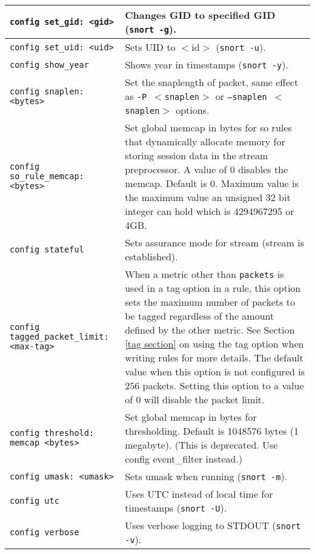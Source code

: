 \documentclass[english]{report}
\begin{document}
\begin{center}
\begin{longtable}[t]{| p{2.5in} | p{3.5in} |}
\hline
\texttt{config set\_gid: <gid>} & Changes GID to specified GID (\texttt{snort
-g}). \\

\hline
\texttt{config set\_uid: <uid>} & Sets UID to $<$id$>$ (\texttt{snort -u}). \\

\hline
\texttt{config show\_year} & Shows year in timestamps (\texttt{snort -y}). \\

\hline
\texttt{config snaplen: <bytes>} & Set the snaplength of packet, same effect as
\texttt{-P $<$snaplen$>$} or \texttt{--snaplen $<$snaplen$>$} options.\\

\hline
\texttt{config so\_rule\_memcap: <bytes>} & Set global memcap in bytes for
so rules that dynamically allocate memory for storing session data in the
stream preprocessor.  A value of 0 disables the memcap.  Default is 0.
Maximum value is the maximum value an unsigned 32 bit integer can hold
which is 4294967295 or 4GB.\\

\hline
\texttt{config stateful} & Sets assurance mode for stream (stream is
established). \\

\hline
\texttt{config tagged\_packet\_limit: <max-tag>} & When a metric other than
\texttt{packets} is used in a tag option in a rule, this option sets the
maximum number of packets to be tagged regardless of the amount defined by the
other metric.  See Section \ref{tag section} on using the tag option when
writing rules for more details.  The default value when this option is not
configured is 256 packets.  Setting this option to a value of 0 will disable
the packet limit. \\

\hline
\texttt{config threshold: memcap <bytes>} & Set global memcap in bytes for
thresholding. Default is 1048576 bytes (1 megabyte). (This is deprecated.
Use config event\_filter instead.)\\

\hline
\texttt{config umask: <umask>} & Sets umask when running (\texttt{snort -m}). \\

\hline
\texttt{config utc} & Uses UTC instead of local time for timestamps
(\texttt{snort -U}). \\

\hline
\texttt{config verbose} & Uses verbose logging to STDOUT (\texttt{snort -v}).
\\


\end{longtable}
\end{center}
\end{document}
